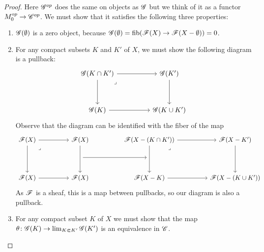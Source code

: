 \documentclass[../../thesis.tex]{subfiles}
\begin{document}
\begin{proof}
    Here $\mathscr{G}^{op}$ does the same on objects as $\mathscr{G}$ but we think of it as a functor $M_0^{op}\to \mathscr{C}^{op}$.
    We must show that it satisfies the following three properties:
    \begin{enumerate}
        \item $\mathscr{G}(\emptyset)$ is a zero object, because $\mathscr{G}(\emptyset)=\operatorname{fib}(\mathscr{F}(X)\to \mathscr{F}(X-\emptyset))=0$.
        \item For any compact subsets $K$ and $K'$ of $X$, we must show the following diagram is a pullback:
              \[\begin{tikzcd}
                      {\G(K\cap K')} && {\G(K')} \\
                      \\
                      {\G(K)} && {\G(K\cup K')}
                      \arrow[from=1-1, to=3-1]
                      \arrow[from=3-1, to=3-3]
                      \arrow[from=1-1, to=1-3]
                      \arrow[from=1-3, to=3-3]
                      \arrow["\lrcorner"{anchor=center, pos=0.125}, draw=none, from=1-1, to=3-3]
                  \end{tikzcd}\]
              Observe that the diagram can be identified with the fiber of the map
              \[\begin{tikzcd}
                      {\F(X)} && {\F(X)} && {\F(X-(K\cap K'))} && {\F(X-K')} \\
                      && {} && {} \\
                      {\F(X)} && {\F(X)} && {\F(X-K)} && {\F(X-(K\cup K'))}
                      \arrow[from=1-5, to=3-5]
                      \arrow[from=3-5, to=3-7]
                      \arrow[from=1-5, to=1-7]
                      \arrow[from=1-7, to=3-7]
                      \arrow["\lrcorner"{anchor=center, pos=0.125}, draw=none, from=1-5, to=3-7]
                      \arrow[from=2-3, to=2-5]
                      \arrow[from=1-3, to=3-3]
                      \arrow[from=1-1, to=1-3]
                      \arrow[from=1-1, to=3-1]
                      \arrow[from=3-1, to=3-3]
                      \arrow["\lrcorner"{anchor=center, pos=0.125}, draw=none, from=1-1, to=3-3]
                  \end{tikzcd}\]
              As $\mathscr{F}$ is a sheaf, this is a map between pullbacks, so our diagram is also a pullback.
        \item For any compact subset $K$ of $X$ we must show that the map $\theta\colon \mathscr{G}(K)\to \lim_{K\Subset K'}\mathscr{G}(K')$ is an equivalence in $\mathscr{C}$.

\end{enumerate}
\end{proof}
\end{document}
